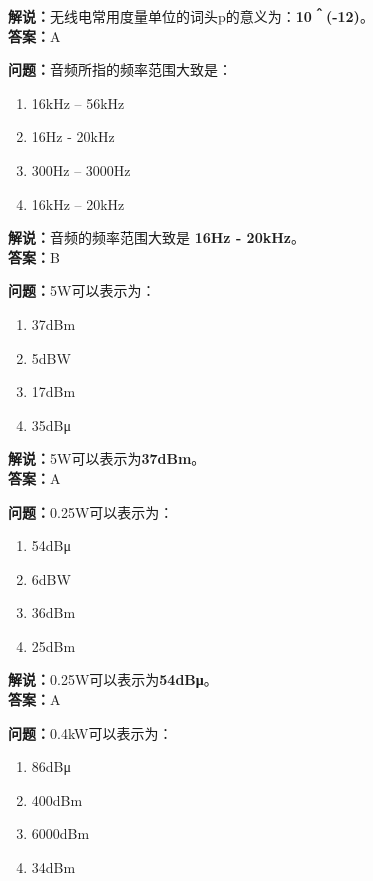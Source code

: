 \textbf{解说：}无线电常用度量单位的词头p的意义为：\textbf{10＾(-12)}。\\\textbf{答案：}A



\textbf{问题：}音频所指的频率范围大致是：

\begin{enumerate}[label=\Alph*), leftmargin=1.5cm]
	\item 16kHz – 56kHz
	\item 16Hz - 20kHz
	\item 300Hz – 3000Hz
	\item 16kHz – 20kHz
\end{enumerate}

\textbf{解说：}音频的频率范围大致是 \textbf{16Hz - 20kHz}。\\\textbf{答案：}B%



\textbf{问题：}5W可以表示为：

\begin{enumerate}[label=\Alph*), leftmargin=1.5cm]
	\item 37dBm
	\item 5dBW
	\item 17dBm
	\item 35dBμ
\end{enumerate}

\textbf{解说：}5W可以表示为\textbf{37dBm}。\\\textbf{答案：}A %



\textbf{问题：}0.25W可以表示为：

\begin{enumerate}[label=\Alph*), leftmargin=1.5cm]
	\item 54dBμ
	\item 6dBW
	\item 36dBm
	\item 25dBm
\end{enumerate}

\textbf{解说：}0.25W可以表示为\textbf{54dBμ}。\\\textbf{答案：}A%



\textbf{问题：}0.4kW可以表示为：

\begin{enumerate}[label=\Alph*), leftmargin=1.5cm]
	\item 86dBμ
	\item 400dBm
	\item 6000dBm
	\item 34dBm
\end{enumerate}

